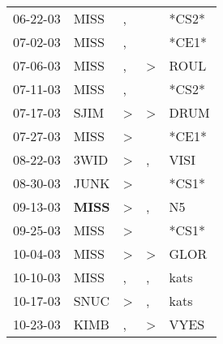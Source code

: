\begin{supertabular}{p{0.07\textwidth}p{0.06\textwidth}p{0.02\textwidth}p{0.02\textwidth}p{0.06\textwidth}}
          06-22-03\textsuperscript{} &           MISS\textsuperscript{} &                , &                  &                            *CS2* \\
          07-02-03\textsuperscript{} &           MISS\textsuperscript{} &                , &                  &                            *CE1* \\
          07-06-03\textsuperscript{} &           MISS\textsuperscript{} &                , &     \textgreater &           ROUL\textsuperscript{} \\
          07-11-03\textsuperscript{} &           MISS\textsuperscript{} &                , &                  &                            *CS2* \\
          07-17-03\textsuperscript{} &           SJIM\textsuperscript{} &     \textgreater &     \textgreater &           DRUM\textsuperscript{} \\
          07-27-03\textsuperscript{} &           MISS\textsuperscript{} &     \textgreater &                  &                            *CE1* \\
          08-22-03\textsuperscript{} &           3WID\textsuperscript{} &     \textgreater &                , &           VISI\textsuperscript{} \\
          08-30-03\textsuperscript{} &           JUNK\textsuperscript{} &     \textgreater &                  &                            *CS1* \\
          09-13-03\textsuperscript{} &  \textbf{MISS\textsuperscript{}} &     \textgreater &                , &             N5\textsuperscript{} \\
          09-25-03\textsuperscript{} &           MISS\textsuperscript{} &     \textgreater &                  &                            *CS1* \\
          10-04-03\textsuperscript{} &           MISS\textsuperscript{} &     \textgreater &     \textgreater &           GLOR\textsuperscript{} \\
          10-10-03\textsuperscript{} &           MISS\textsuperscript{} &                , &                , &           kats\textsuperscript{} \\
          10-17-03\textsuperscript{} &           SNUC\textsuperscript{} &     \textgreater &                , &           kats\textsuperscript{} \\
          10-23-03\textsuperscript{} &           KIMB\textsuperscript{} &                , &     \textgreater &           VYES\textsuperscript{} \\

\end{supertabular}
